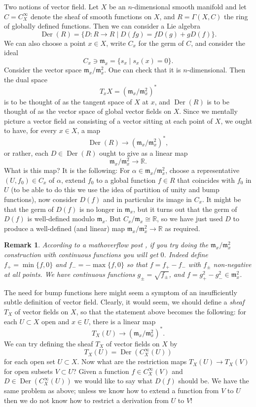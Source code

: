 \documentclass[12pt]{article}
\theoremstyle{plain}
\newtheorem{rem}[thm]{Remark}
\theoremstyle{definition}
\numberwithin{equation}{section}
\DeclareMathOperator{\Der}{Der}
\newcommand{\m}{\mathfrak{m}}
\newcommand{\al}{\alpha}
\newcommand{\R}{\mathbb{R}}
\begin{document}
Two notions of vector field. Let $X$ be an $n$-dimensional smooth manifold and let $C = C^\infty_X$ denote the sheaf of smooth functions on $X$, and $R = \Gamma(X, C)$ the ring of globally defined functions. Then we can consider a Lie algebra
\[
\Der(R) = \{D : R \rightarrow R \mid D(fg) = fD(g) + gD(f)\}.
\]
We can also choose a point $x \in X$, write $C_x$ for the germ of $C$, and consider the ideal
\[
C_x \ni \m_x = \{s_x \mid s_x(x) = 0\}.
\]
Consider the vector space $\m_x / \m_x^2$. One can check that it is $n$-dimensional. Then the dual space
\[
T_x X = (\m_x / \m_x^2)^*
\]
is to be thought of as the tangent space of $X$ at $x$, and $\Der(R)$ is to be thought of as the vector space of global vector fields on $X$. Since we mentally picture a vector field as consisting of a vector sitting at each point of $X$, we ought to have, for every $x \in X$, a map
\[
\Der(R) \rightarrow (\m_x / \m_x^2)^*,
\]
or rather, each $D \in \Der(R)$ ought to give as a linear map
\[
\m_x / \m_x^2 \rightarrow \R.
\]
What is this map? It is the following: For $\alpha \in \m_x / \m_x^2$, choose a representative $(U, f_0) \in C_x$ of $\al$, extend $f_0$ to a global function $f \in R$ that coincides with $f_0$ in $U$ (to be able to do this we use the idea of partition of unity and bump functions), now consider $D(f)$ and in particular its image in $C_x$. It might be that the germ of $D(f)$ is no longer in $\m_x$, but it turns out that the germ of $D(f)$ is well-defined modulo $\m_x$. But $C_x / \m_x \cong \R$, so we have just used $D$ to produce a well-defined (and linear) map $\m_x / \m_x^2 \rightarrow \R$ as required.

\begin{rem}
According to a mathoverflow post \cite{cont.bad}, if you try doing the $\m_x / \m_x^2$ construction with continuous functions you will get $0$. Indeed define $f_+ = \min\{f, 0\}$ and $f_- = -\max\{f, 0\}$ so that $f = f_+ - f_-$ with $f_\pm$ non-negative at all points. We have continuous functions $g_\pm = \sqrt{f_\pm}$, and $f = g_+^2 - g_-^2 \in \m_x^2$.
\end{rem}


The need for bump functions here might seem a symptom of an insufficiently subtle definition of vector field. Clearly, it would seem, we should define a \emph{sheaf} $T_X$ of vector fields on $X$, so that the statement above becomes the following: for each $U \subset X$ open and $x \in U$, there is a linear map
\[
T_X(U) \rightarrow (\m_x / \m_x^2)^*.
\]
We can try defining the sheaf $T_X$ of vector fields on $X$ by
\[
T_X(U) = \Der(C_X^\infty(U))
\]
for each open set $U \subset X$. Now what are the restriction maps $T_X(U) \rightarrow T_X(V)$ for open subsets $V \subset U$? Given a function $f \in C_X^\infty(V)$ and $D \in \Der(C_X^\infty(U))$ we would like to say what $D(f)$ should be. We have the same problem as above; unless we know how to extend a function from $V$ to $U$ then we do not know how to restrict a derivation from $U$ to $V$!
\end{document}
